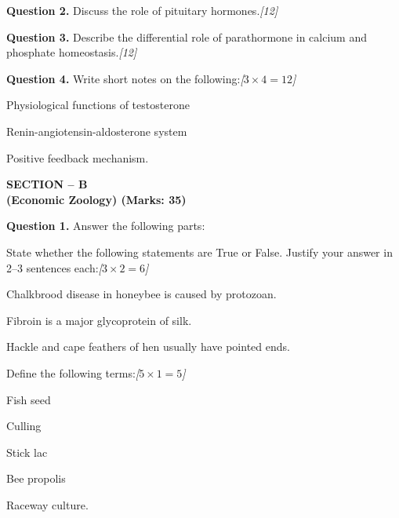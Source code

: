 \documentclass[11pt,a4paper]{article}
\newcommand{\pts}[1]{\hfill   \textit{[#1]}}
\begin{document}
\medskip


\noindent   \textbf{Question 2.} Discuss the role of pituitary hormones.\pts{12}

\medskip


\noindent   \textbf{Question 3.} Describe the differential role of parathormone in calcium and phosphate homeostasis.\pts{12}

\medskip


\noindent   \textbf{Question 4.} Write short notes on the following:\pts{$3  \times 4 = 12$}

\begin{parts}
  \item Physiological functions of testosterone
  \item Renin-angiotensin-aldosterone system
  \item Positive feedback mechanism.
\end{parts}

\pagebreak

\begin{center}
   \textbf{SECTION -- B} \\
   \textbf{(Economic Zoology) (Marks: 35)}
\end{center}

\medskip


\noindent   \textbf{Question 1.} Answer the following parts:

\begin{parts}
  \item State whether the following statements are True or False. Justify your answer in 2--3 sentences each:\pts{$3  \times 2 = 6$}
  
\begin{parts}
    \item Chalkbrood disease in honeybee is caused by protozoan.
    \item Fibroin is a major glycoprotein of silk.
    \item Hackle and cape feathers of hen usually have pointed ends.
  \end{parts}

  \item Define the following terms:\pts{$5  \times 1 = 5$}
  
\begin{parts}
    \item Fish seed
    \item Culling
    \item Stick lac
    \item Bee propolis
    \item Raceway culture.
  \end{parts}
\end{parts}
\end{document}
